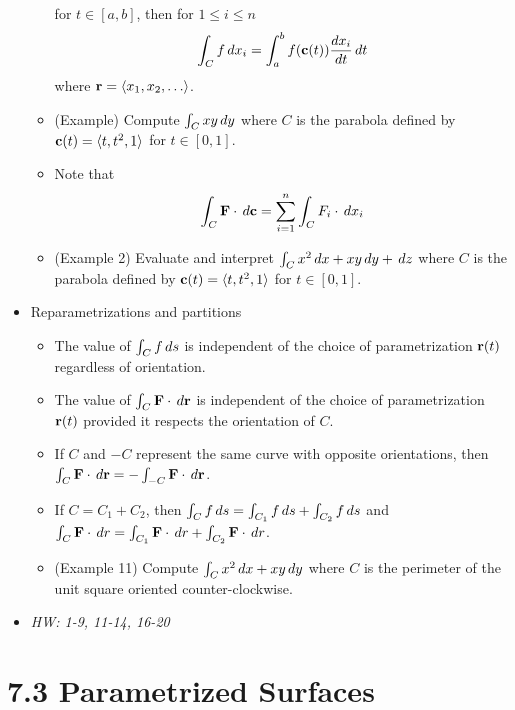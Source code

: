 \documentclass[11pt]{article}
\begin{document}
\begin{itemize}
\begin{itemize}
            for \(t\in[a,b]\), then for \(1\leq i\leq n\)
            \[
              \int_C f\,d x_i
                =
              \int_a^b f(\mathbf{c}(t))\frac{dx_i}{dt}\,d t
            \]
            where \(\vect r=\<x_1,x_2,\dots\>\).
      \item (Example)
            Compute \(\int_C xy\,d y\) where \(C\) is the parabola defined
            by \(\mathbf{c}(t)=\langle t,t^2,1\rangle\) for \(t\in[0,1]\).
      \item Note that
            \[
              \int_C \mathbf{F}\cdot\,d\mathbf{c}
                =
              \sum_{i=1}^n \int_C F_i\cdot\,d x_i
            \]
      \item (Example 2) Evaluate and interpret
            \(\int_C x^2\,d x+xy\,d y+\,d z\) where \(C\) is the
            parabola defined
            by \(\mathbf{c}(t)=\langle t,t^2,1\rangle\) for \(t\in[0,1]\).
    \end{itemize}
  \item Reparametrizations and partitions
    \begin{itemize}
      \item The value of \(\int_C f\,d s\)
            is independent of the choice of parametrization \(\mathbf{r}(t)\)
            regardless of orientation.
      \item The value of \(\int_C \mathbf{F}\cdot\,d \mathbf{r}\)
            is independent of the choice of parametrization \(\mathbf{r}(t)\)
            provided it respects the orientation of \(C\).
      \item If \(C\) and \(-C\) represent the same curve with opposite
            orientations, then
            \(\int_C \mathbf{F}\cdot\,d\mathbf{r}=-\int_{-C}\mathbf{F}\cdot\,d\mathbf{r}\).
      \item If \(C=C_1+C_2\), then
            \(\int_C f\,d s=\int_{C_1}f\,d s+\int_{C_2}f\,d s\) and
            \(
              \int_C \mathbf{F}\cdot\,d r
                =
              \int_{C_1}\mathbf{F}\cdot\,d r+\int_{C_2}\mathbf{F}\cdot\,d r
            \).
      \item (Example 11) Compute \(\int_C x^2\,d x+xy\,d y\) where
            \(C\) is the perimeter of the unit square oriented counter-clockwise.
    \end{itemize}
  \item\textit{
    HW: 1-9, 11-14, 16-20
  }
\end{itemize}



\section*{7.3 Parametrized Surfaces}
\end{document}
